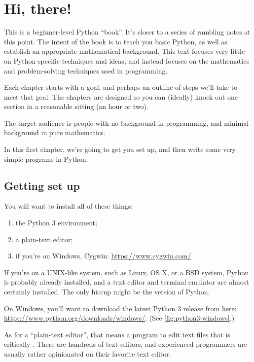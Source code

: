 \chapter{Hi, there!}

This is a beginner-level Python ``book''. It's closer to a series of
rambling notes at this point. The intent of the book is to teach you
basic Python, as well as establish an appropriate mathematical
background. This text focuses very little on Python-specific
techniques and ideas, and instead focuses on the mathematics and
problem-solving techniques used in programming.

Each chapter starts with a goal, and perhaps an outline of steps we'll
take to meet that goal. The chapters are designed so you can (ideally)
knock out one section in a reasonable sitting (an hour or two).

The target audience is people with no background in programming, and
minimal background in pure mathematics.

In this first chapter, we're going to get you set up, and then write
some very simple programs in Python.

\section{Getting set up}

You will want to install all of these things:

\begin{enumerate}
\item the Python 3 environment;
\item a plain-text editor;
\item if you're on Windows, Cygwin: \url{https://www.cygwin.com/}.
\end{enumerate}

If you're on a UNIX-like system, such as Linux, OS X, or a BSD system,
Python is probably already installed, and a text editor and terminal
emulator are almost certainly installed. The only hiccup might be the
version of Python.

On Windows, you'll want to download the latest Python 3 release from
here: \url{https://www.python.org/downloads/windows/}. (See
\cref{fig:python3-windows}.)

As for a ``plain-text editor'', that means a program to edit text
files that is critically . There are
hundreds of text editors, and experienced programmers are usually
rather opinionated on their favorite text editor.

